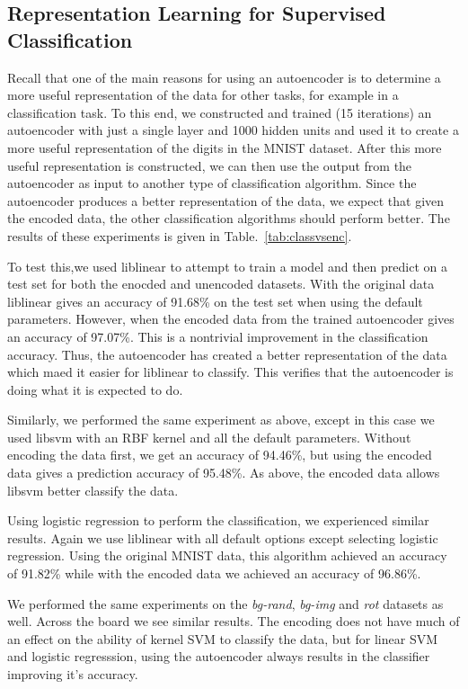 \subsection{Representation Learning for Supervised Classification}

Recall that one of the main reasons for using an autoencoder is to determine a
more useful representation of the data for other tasks, for example in a
classification task. To this end, we constructed and trained (15 iterations) an
autoencoder with just a single layer and 1000 hidden units and used it to
create a more useful representation of the digits in the MNIST dataset. After
this more useful representation is constructed, we can then use the output from
the autoencoder as input to another type of classification algorithm.  Since
the autoencoder produces a better representation of the data, we expect that
given the encoded data, the other classification algorithms should perform
better.  The results of these experiments is given in
Table.~\ref{tab:classvsenc}.

To test this,we used liblinear to attempt to train a model and then predict on
a test set for both the enocded and unencoded datasets. With the original data
liblinear gives an accuracy of 91.68\% on the test set when using the default
parameters. However, when the encoded data from the trained autoencoder gives
an accuracy of 97.07\%. This is a nontrivial improvement in the classification
accuracy. Thus, the autoencoder has created a better representation of the data
which maed it easier for liblinear to classify. This verifies that the
autoencoder is doing what it is expected to do.

Similarly, we performed the same experiment as above, except in this case we
used libsvm with an RBF kernel and all the default parameters.  Without
encoding the data first, we get an accuracy of 94.46\%, but using the encoded
data gives a prediction accuracy of 95.48\%. As above, the encoded data allows libsvm
better classify the data.

Using logistic regression to perform the classification, we experienced similar results.
Again we use liblinear with all default options except selecting logistic regression. Using the
original MNIST data, this algorithm achieved an accuracy of 91.82\% while with the encoded data
we achieved an accuracy of 96.86\%.

We performed the same experiments on the \textit{bg-rand}, \textit{bg-img} and 
\textit{rot} datasets as well. Across the board we see similar results. The encoding does not have much of
an effect on the ability of kernel SVM to classify the data, but for linear SVM and logistic regresssion, 
using the autoencoder always results in the classifier improving it's accuracy. 


